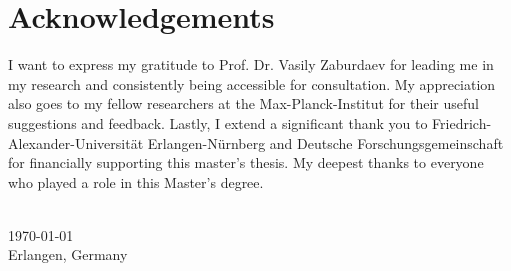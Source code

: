 \chapter*{Acknowledgements}

I want to express my gratitude to 
Prof. Dr. Vasily Zaburdaev for leading me in my 
research and consistently being accessible for consultation.
 My appreciation also goes to my fellow researchers at the 
 Max-Planck-Institut for their useful suggestions and 
 feedback. Lastly, I extend a significant thank you to
  Friedrich-Alexander-Universität Erlangen-Nürnberg and 
  Deutsche Forschungsgemeinschaft for financially supporting
   this master's thesis. My deepest thanks to everyone who played a role in this Master's degree.

{
\makeatletter
\vspace{1cm}
\raggedleft
\@author{}\\
\today{}\\
Erlangen, Germany\\
\raggedright
\makeatother
}
